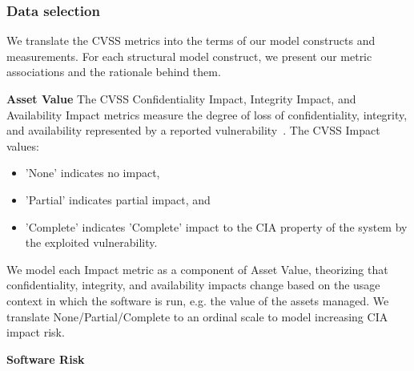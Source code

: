 \subsubsection{Data selection}
 We translate the CVSS metrics into the terms of our model constructs and measurements. For each structural model construct, we present our metric associations and the rationale behind them.
 
\textbf{Asset Value}
The CVSS Confidentiality Impact, Integrity Impact, and Availability Impact metrics measure the degree of loss of confidentiality, integrity, and availability represented by a reported vulnerability~\cite{mell2007complete}. The CVSS Impact values:
	\begin{itemize}
		\item 'None' indicates no impact, 
		\item 'Partial' indicates partial impact, and 
		\item 'Complete' indicates 'Complete' impact to the CIA property of the system by the exploited vulnerability.  
	\end{itemize}
We model each Impact metric as a component of Asset Value, theorizing that confidentiality, integrity, and availability impacts change based on the usage context in which the software is run, e.g. the value of the assets managed. We translate None/Partial/Complete to an ordinal scale to model increasing CIA impact risk.

\textbf{Software Risk}

